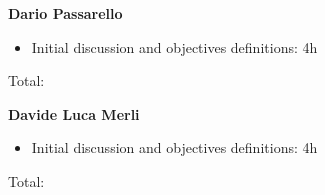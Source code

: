 \textbf{Dario Passarello}
\begin{itemize}
    \item Initial discussion and objectives definitions: 4h
\end{itemize}

Total:

\bigskip

\textbf{Davide Luca Merli}

\begin{itemize}
    \item Initial discussion and objectives definitions: 4h
\end{itemize}

Total: